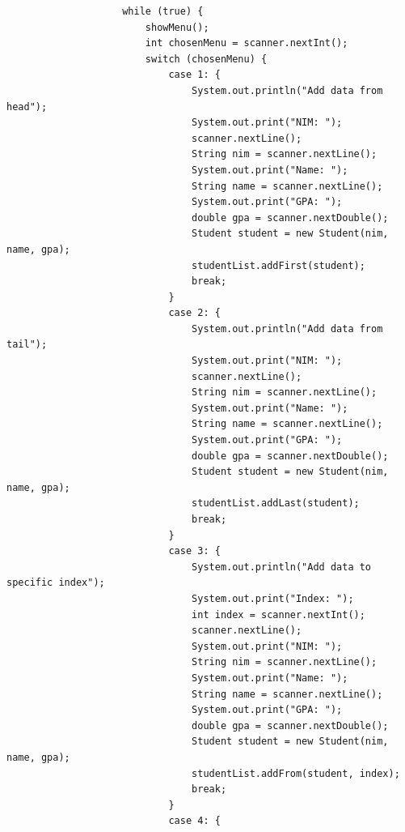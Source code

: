 \documentclass[12pt,titlepage]{article}
\begin{document}
\begin{enumerate}
{\begin{verbatim}
                    while (true) {
                        showMenu();
                        int chosenMenu = scanner.nextInt();
                        switch (chosenMenu) {
                            case 1: {
                                System.out.println("Add data from head");
                                System.out.print("NIM: ");
                                scanner.nextLine();
                                String nim = scanner.nextLine();
                                System.out.print("Name: ");
                                String name = scanner.nextLine();
                                System.out.print("GPA: ");
                                double gpa = scanner.nextDouble();
                                Student student = new Student(nim, name, gpa);
                                studentList.addFirst(student);
                                break;
                            }
                            case 2: {
                                System.out.println("Add data from tail");
                                System.out.print("NIM: ");
                                scanner.nextLine();
                                String nim = scanner.nextLine();
                                System.out.print("Name: ");
                                String name = scanner.nextLine();
                                System.out.print("GPA: ");
                                double gpa = scanner.nextDouble();
                                Student student = new Student(nim, name, gpa);
                                studentList.addLast(student);
                                break;
                            }
                            case 3: {
                                System.out.println("Add data to specific index");
                                System.out.print("Index: ");
                                int index = scanner.nextInt();
                                scanner.nextLine();
                                System.out.print("NIM: ");
                                String nim = scanner.nextLine();
                                System.out.print("Name: ");
                                String name = scanner.nextLine();
                                System.out.print("GPA: ");
                                double gpa = scanner.nextDouble();
                                Student student = new Student(nim, name, gpa);
                                studentList.addFrom(student, index);
                                break;
                            }
                            case 4: {

\end{verbatim}}
\end{enumerate}
\end{document}
